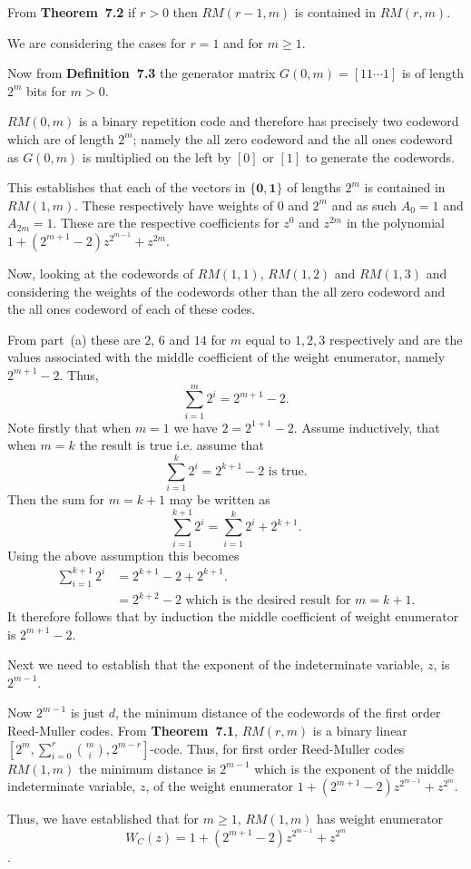 From \textbf{Theorem~7.2} if $r>0$ then $RM(r-1,m)$ is contained in $RM(r,m)$. 

We are considering the cases for $r=1$ and for $m\geq1$. 

Now from \textbf{Definition~7.3} the generator matrix  $G(0,m) = [11\cdots1]$ is of length $2^m$ bits for $m>0$. 

$RM(0,m)$ is a binary repetition code and therefore has precisely two codeword which are of length $2^m$; namely the all zero codeword and the all ones codeword as $G(0,m)$ is multiplied on the left by $[0]$ or $[1]$ to generate the codewords.

This establishes that each of the vectors in $\{\bm{0}, \bm{1}\}$ of lengths $2^m$ is contained in $RM(1,m)$. These respectively have weights of $0$ and $2^m$ and as such $A_0 =1$ and $A_{2m}=1$. These are the respective coefficients for $z^0$ and $z^{2m}$ in the polynomial $1 + (2^{m+1}-2)z^{2^{m-1}} + z^{2{m}}$.

Now, looking at the codewords of $RM(1,1)$, $RM(1,2)$ and $RM(1,3)$ and considering the weights of the codewords other than the all zero codeword and the all ones codeword of each of these codes. 

From part~(a) these are $2$, $6$ and $14$ for $m$ equal to $1,2,3$ respectively and are the values associated with the middle coefficient of the weight enumerator, namely $2^{m+1}-2$. Thus,
\[
	\sum_{i=1}^m 2^i = 2^{m+1} - 2.
\]
Note firstly that when $m=1$ we have $2 = 2^{1+1} - 2$. Assume inductively, that when $m=k$ the result is true i.e. assume that
\[
	\sum_{i=1}^k 2^i = 2^{k+1} - 2 \text{ is true.}
\]
Then the sum for $m=k+1$ may be written as 
\[
	\sum_{i=1}^{k+1} 2^i = \sum_{i=1}^k 2^i + 2^{k+1}.
\]
Using the above assumption this becomes
\begin{align*}
	\sum_{i=1}^{k+1} 2^i &= 2^{k+1} - 2 + 2^{k+1}.\\
	&= 2^{k+2} - 2 \text{ which is the desired result for } m= k+1.
\end{align*}
It therefore follows that by induction the middle coefficient of weight enumerator is $2^{m+1} - 2$.

Next we need to establish that the exponent of the indeterminate variable, $z$, is $2^{m-1}$. 

Now $2^{m-1}$ is just $d$, the minimum distance of the codewords of the first order Reed-Muller codes. From \textbf{Theorem~7.1}, $RM(r,m)$ is a binary linear $[2^m,\sum_{i=0}^r\binom{m}{i},2^{m-r}]$-code. Thus, for first order Reed-Muller codes $RM(1,m)$ the minimum distance is $2^{m-1}$ which is the exponent of the middle indeterminate variable, $z$, of the weight enumerator $1 + (2^{m+1} - 2)z^{2^{m-1}} + z^{2^m}$.

Thus, we have established that for $m\geq1$, $RM(1,m)$ has weight enumerator \[W_{C}(z) = 1 + (2^{m+1} - 2)z^{2^{m-1}} + z^{2^m}\].

